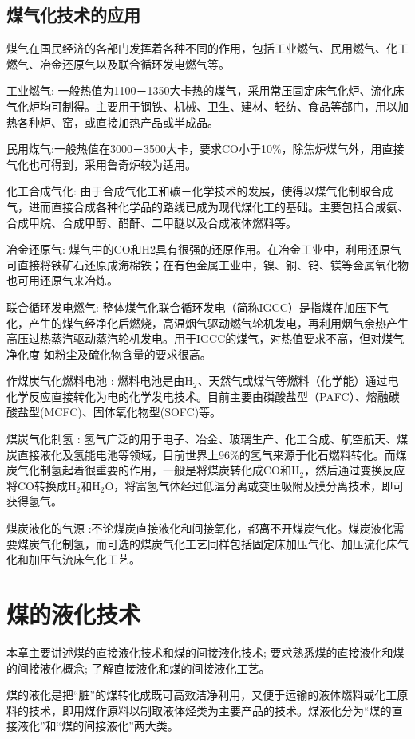 \documentclass[10pt,openany]{ctexbook}
\begin{document}
\section{煤气化技术的应用 }
煤气在国民经济的各部门发挥着各种不同的作用，包括工业燃气、民用燃气、化工燃气、冶金还原气以及联合循环发电燃气等。\par
工业燃气:
       一般热值为1100－1350大卡热的煤气，采用常压固定床气化炉、流化床气化炉均可制得。主要用于钢铁、机械、卫生、建材、轻纺、食品等部门，用以加热各种炉、窑，或直接加热产品或半成品。\par
   民用煤气:一般热值在3000－3500大卡，要求CO小于10\%，除焦炉煤气外，用直接气化也可得到，采用鲁奇炉较为适用。\par
化工合成气化: 由于合成气化工和碳－化学技术的发展，使得以煤气化制取合成气，进而直接合成各种化学品的路线已成为现代煤化工的基础。主要包括合成氨、合成甲烷、合成甲醇、醋酐、二甲醚以及合成液体燃料等。\par
  冶金还原气:  煤气中的CO和H2具有很强的还原作用。在冶金工业中，利用还原气可直接将铁矿石还原成海棉铁；在有色金属工业中，镍、铜、钨、镁等金属氧化物也可用还原气来冶炼。\par
 联合循环发电燃气:
       整体煤气化联合循环发电（简称IGCC）是指煤在加压下气化，产生的煤气经净化后燃烧，高温烟气驱动燃气轮机发电，再利用烟气余热产生高压过热蒸汽驱动蒸汽轮机发电。用于IGCC的煤气，对热值要求不高，但对煤气净化度-如粉尘及硫化物含量的要求很高。 \par
       作煤炭气化燃料电池  :
       燃料电池是由H$_2$、天然气或煤气等燃料（化学能）通过电化学反应直接转化为电的化学发电技术。目前主要由磷酸盐型（PAFC）、熔融碳酸盐型(MCFC)、固体氧化物型(SOFC)等。 \par

 煤炭气化制氢  : 氢气广泛的用于电子、冶金、玻璃生产、化工合成、航空航天、煤炭直接液化及氢能电池等领域，目前世界上96\%的氢气来源于化石燃料转化。而煤炭气化制氢起着很重要的作用，一般是将煤炭转化成CO和H$_2$，然后通过变换反应将CO转换成H$_2$和H$_2$O，将富氢气体经过低温分离或变压吸附及膜分离技术，即可获得氢气。\par
煤炭液化的气源 :不论煤炭直接液化和间接氧化，都离不开煤炭气化。煤炭液化需要煤炭气化制氢，而可选的煤炭气化工艺同样包括固定床加压气化、加压流化床气化和加压气流床气化工艺。
 \chapter{煤的液化技术}
本章主要讲述煤的直接液化技术和煤的间接液化技术;
要求熟悉煤的直接液化和煤的间接液化概念;
了解直接液化和煤的间接液化工艺。\par
煤的液化是把“脏”的煤转化成既可高效洁净利用，又便于运输的液体燃料或化工原料的技术，即用煤作原料以制取液体烃类为主要产品的技术。煤液化分为“煤的直接液化”和“煤的间接液化”两大类。
\end{document}

